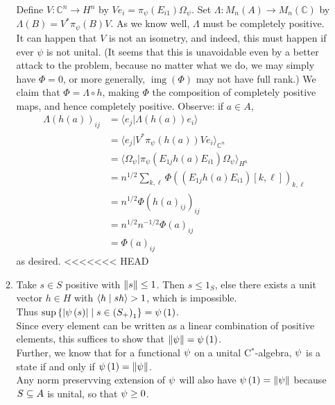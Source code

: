 \documentclass[a4paper,10pt]{report}
\newcommand{\ggen}[1]{\langle#1\rangle}
\newcommand{\C}{\mathbb{C}}
\DeclareMathOperator{\img}{img}
\begin{document}
\begin{enumerate}
\begin{enumerate}
				Define $V:\C^n\to H^n$ by $Ve_i=\pi_\psi(E_{i1})\Omega_\psi$. Set $\Lambda:M_n(A)\to M_n(\C)$ by $\Lambda(B)=V^*\pi_\psi(B)V$. As we know well, $\Lambda$ must be completely positive. It can happen that $V$ is not an isometry, and indeed, this must happen if ever $\psi$ is not unital. 
				(It seems that this is unavoidable even by a better attack to the problem, because no matter what we do, we may simply have $\Phi=0$, or more generally, $\img(\Phi)$ may not have full rank.) 
				We claim that $\Phi=\Lambda\circ h$, making $\Phi$ the composition of completely positive maps, and hence completely positive. Observe: if $a\in A$, 
				\begin{align*}
					\Lambda(h(a))_{ij} &= \ggen{e_j|\Lambda(h(a))e_i}\\
					&= \ggen{e_j|V^*\pi_\psi(h(a))Ve_i}_{\C^n}\\
					&= \ggen{\Omega_\psi|\pi_\psi(E_{1j}h(a)E_{i1})\Omega_\psi}_{H^n}\\
					&= n^{1/2}\sum_{k,\ell}\Phi((E_{1j}h(a)E_{i1})[k,\ell])_{k,\ell}\\
					&= n^{1/2}\Phi(h(a)_{ij})_{ij}\\
					&= n^{1/2}n^{-1/2}\Phi(a)_{ij}\\
					&= \Phi(a)_{ij}
				\end{align*}
				as desired. 
<<<<<<< HEAD
			      \item Take $s \in S$ positive with $\left\| s \right\| \leq 1$.  Then $s \leq 1_S$, else there exists a unit vector $h \in H$ with $\left\langle h \mid s h \right\rangle > 1$, which is impossible.\\
                                Thus $\sup \left\{ \left| \psi \left( s \right) \right| \mid s \in \left( S_+ \right)_1 \right\} = \psi \left( 1 \right)$.\\
                                Since every element can be written as a linear combination of positive elements, this suffices to show that $\left\| \psi \right\| = \psi \left( 1 \right)$.\\
                                Further, we know that for a functional $\psi$ on a unital C$^*$-algebra, $\psi$ is a state if and only if $\psi \left( 1 \right) = \left\| \psi \right\|$.\\
                                Any norm preservving extension of $\psi$ will also have $\psi \left( 1 \right) = \left\| \psi \right\|$ because $S \subseteq A$ is unital, so that $\psi \geq 0$.\\
                                

\end{enumerate}
\end{enumerate}
\end{document}
